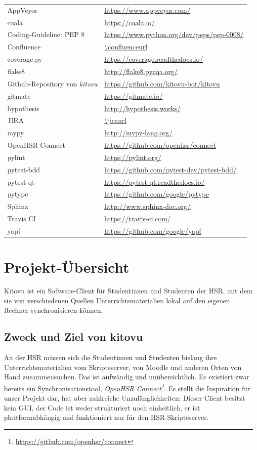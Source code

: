 \documentclass[a4paper]{article}
\begin{document}
\begin{tabular}{ll}
	AppVeyor & \url{https://www.appveyor.com/} \\
	coala & \url{https://coala.io/} \\
	Coding-Guideline: PEP 8 & \url{https://www.python.org/dev/peps/pep-0008/} \\
	Confluence & \url{\confluenceurl} \\
	coverage.py & \url{https://coverage.readthedocs.io/} \\
	flake8 & \url{http://flake8.pycqa.org/} \\
	Github-Repository von \emph{kitovu} & \url{https://github.com/kitovu-bot/kitovu} \\
	gitmate & \url{https://gitmate.io/} \\
	hypothesis & \url{http://hypothesis.works/} \\
	JIRA	& \url{\jiraurl} \\
	mypy & \url{http://mypy-lang.org/} \\
	OpenHSR Connect & \url{https://github.com/openhsr/connect} \\
	pylint & \url{https://pylint.org/} \\
	pytest-bdd & \url{https://github.com/pytest-dev/pytest-bdd/} \\
	pytest-qt & \url{https://pytest-qt.readthedocs.io/} \\
	pytype & \url{https://github.com/google/pytype} \\ 
	Sphinx & \url{http://www.sphinx-doc.org/} \\
	Travis CI & \url{https://travis-ci.com/} \\
	yapf & \url{https://github.com/google/yapf} \\
	
\end{tabular}

\section{Projekt-Übersicht}
Kitovu ist ein Software-Client für Studentinnen und Studenten der HSR, mit dem sie von verschiedenen Quellen Unterrichtsmaterialien lokal auf den eigenen Rechner synchronisieren können.

\subsection{Zweck und Ziel von kitovu}
An der HSR müssen sich die Studentinnen und Studenten bislang ihre Unterrichtsmaterialien vom Skripteserver, von Moodle und anderen Orten von Hand zusammensuchen. Das ist aufwändig und unübersichtlich. Es existiert zwar bereits ein Synchronisationstool, \emph{OpenHSR Connect\footnote{\url{https://github.com/openhsr/connect}}}. Es stellt die Inspiration für unser Projekt dar, hat aber zahlreiche Unzulänglichkeiten: Dieser Client besitzt kein GUI, der Code ist weder strukturiert noch einheitlich, er ist plattformabhängig und funktioniert nur für den HSR-Skripteserver.
\end{document}
